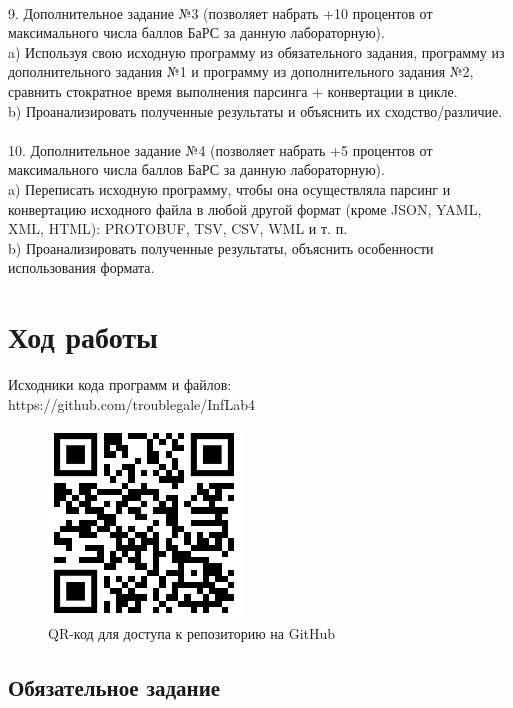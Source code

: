 \documentclass[12pt]{article}
\begin{document}
\\
9. Дополнительное задание №3 (позволяет набрать +10 процентов от максимального числа баллов БаРС за данную лабораторную).\\
\indent a) Используя свою исходную программу из обязательного задания, программу из дополнительного задания №1 и программу из дополнительного задания №2, сравнить стократное время выполнения парсинга + конвертации в цикле.\\
\indent b) Проанализировать полученные результаты и объяснить их сходство/различие.\\
\\
10. Дополнительное задание №4 (позволяет набрать +5 процентов от максимального числа баллов БаРС за данную лабораторную).\\
\indent a) Переписать исходную программу, чтобы она осуществляла парсинг и конвертацию исходного файла в любой другой формат (кроме JSON, YAML, XML, HTML): PROTOBUF, TSV, CSV, WML и т. п.\\
\indent b) Проанализировать полученные результаты, объяснить особенности использования формата.\\

\newpage

\section{Ход работы}

Исходники кода программ и файлов:\\
https://github.com/troublegale/InfLab4\\

\begin{figure}[h]
    \centering
    \includegraphics{image1.png}
    \caption{QR-код для доступа к репозиторию на GitHub}
\end{figure}

\subsection{Обязательное задание}
\end{document}
